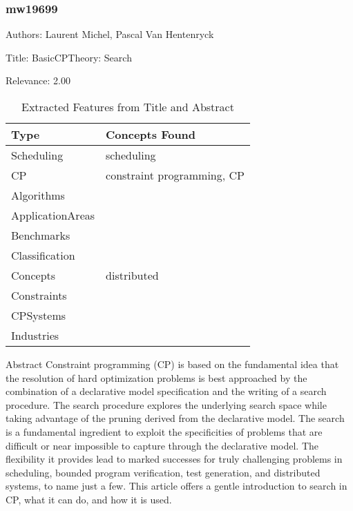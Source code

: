 \subsubsection{mw19699}
\label{mw:mw19699}

Authors: Laurent Michel, Pascal Van Hentenryck

Title: BasicCPTheory: Search

Relevance:  2.00

{\scriptsize
\begin{longtable}{p{2cm}p{20cm}}
\caption{Extracted Features from Title and Abstract}\\ \toprule
Type & Concepts Found\\ \midrule
\endhead
\bottomrule
\endfoot
Scheduling & scheduling\\ 
CP & constraint programming, CP\\ 
Algorithms & \\ 
ApplicationAreas & \\ 
Benchmarks & \\ 
Classification & \\ 
Concepts & distributed\\ 
Constraints & \\ 
CPSystems & \\ 
Industries & \\ 
\end{longtable}
}

 Abstract  Constraint programming (CP) is based on the fundamental idea that the resolution of hard optimization problems is best approached by the combination of a declarative model specification and the writing of a search procedure. The search procedure explores the underlying search space while taking advantage of the pruning derived from the declarative model. The search is a fundamental ingredient to exploit the specificities of problems that are difficult or near impossible to capture through the declarative model. The flexibility it provides lead to marked successes for truly challenging problems in scheduling, bounded program verification, test generation, and distributed systems, to name just a few. This article offers a gentle introduction to search in CP, what it can do, and how it is used. 

